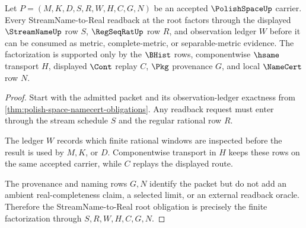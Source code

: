 \begin{theorem}
\label{thm:polishspace-streamname-real-root-obligation}
Let $P=(M,K,D,S,R,W,H,C,G,N)$ be an accepted $\PolishSpaceUp$ carrier. Every
StreamName-to-Real readback at the root factors through the displayed
$\StreamNameUp$ row $S$, $\RegSeqRatUp$ row $R$, and observation ledger $W$
before it can be consumed as metric, complete-metric, or separable-metric
evidence. The factorization is supported only by the $\BHist$ rows,
componentwise $\hsame$ transport $H$, displayed $\Cont$ replay $C$, $\Pkg$
provenance $G$, and local $\NameCert$ row $N$.
\end{theorem}
\begin{proof}
Start with the admitted packet and its observation-ledger exactness from
\autoref{thm:polish-space-namecert-obligations}. Any readback request must
enter through the stream schedule $S$ and the regular rational row $R$.

The ledger $W$ records which finite rational windows are inspected before
the result is used by $M,K$, or $D$. Componentwise transport in $H$ keeps
these rows on the same accepted carrier, while $C$ replays the displayed
route.

The provenance and naming rows $G,N$ identify the packet but do not add an
ambient real-completeness claim, a selected limit, or an external readback
oracle. Therefore the StreamName-to-Real root obligation is precisely the
finite factorization through $S,R,W,H,C,G,N$.
\end{proof}

